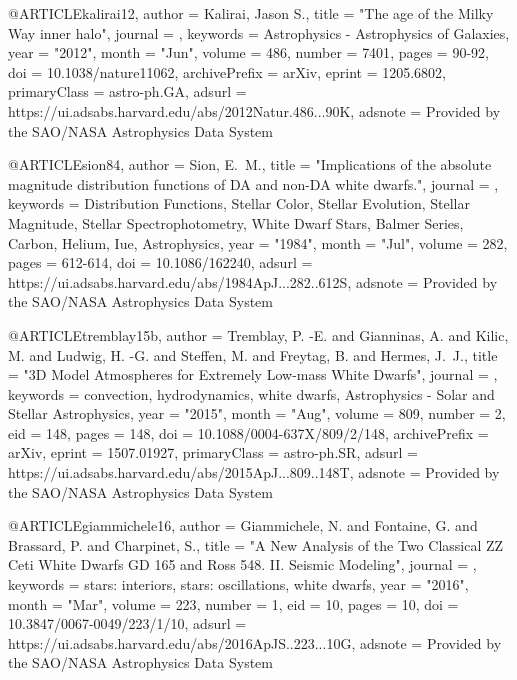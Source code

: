 \documentclass[a4paper,fleqn,usenatbib]{mnras}
\begin{document}
@ARTICLE{kalirai12,
       author = {{Kalirai}, Jason S.},
        title = "{The age of the Milky Way inner halo}",
      journal = {\nat},
     keywords = {Astrophysics - Astrophysics of Galaxies},
         year = "2012",
        month = "Jun",
       volume = {486},
       number = {7401},
        pages = {90-92},
          doi = {10.1038/nature11062},
archivePrefix = {arXiv},
       eprint = {1205.6802},
 primaryClass = {astro-ph.GA},
       adsurl = {https://ui.adsabs.harvard.edu/abs/2012Natur.486...90K},
      adsnote = {Provided by the SAO/NASA Astrophysics Data System}
}

@ARTICLE{sion84,
       author = {{Sion}, E.~M.},
        title = "{Implications of the absolute magnitude distribution functions of DA and non-DA white dwarfs.}",
      journal = {\apj},
     keywords = {Distribution Functions, Stellar Color, Stellar Evolution, Stellar Magnitude, Stellar Spectrophotometry, White Dwarf Stars, Balmer Series, Carbon, Helium, Iue, Astrophysics},
         year = "1984",
        month = "Jul",
       volume = {282},
        pages = {612-614},
          doi = {10.1086/162240},
       adsurl = {https://ui.adsabs.harvard.edu/abs/1984ApJ...282..612S},
      adsnote = {Provided by the SAO/NASA Astrophysics Data System}
}


@ARTICLE{tremblay15b,
       author = {{Tremblay}, P. -E. and {Gianninas}, A. and {Kilic}, M. and
         {Ludwig}, H. -G. and {Steffen}, M. and {Freytag}, B. and
         {Hermes}, J.~J.},
        title = "{3D Model Atmospheres for Extremely Low-mass White Dwarfs}",
      journal = {\apj},
     keywords = {convection, hydrodynamics, white dwarfs, Astrophysics - Solar and Stellar Astrophysics},
         year = "2015",
        month = "Aug",
       volume = {809},
       number = {2},
          eid = {148},
        pages = {148},
          doi = {10.1088/0004-637X/809/2/148},
archivePrefix = {arXiv},
       eprint = {1507.01927},
 primaryClass = {astro-ph.SR},
       adsurl = {https://ui.adsabs.harvard.edu/abs/2015ApJ...809..148T},
      adsnote = {Provided by the SAO/NASA Astrophysics Data System}
}


@ARTICLE{giammichele16,
       author = {{Giammichele}, N. and {Fontaine}, G. and {Brassard}, P. and
         {Charpinet}, S.},
        title = "{A New Analysis of the Two Classical ZZ Ceti White Dwarfs GD 165 and Ross 548. II. Seismic Modeling}",
      journal = {\apjs},
     keywords = {stars: interiors, stars: oscillations, white dwarfs},
         year = "2016",
        month = "Mar",
       volume = {223},
       number = {1},
          eid = {10},
        pages = {10},
          doi = {10.3847/0067-0049/223/1/10},
       adsurl = {https://ui.adsabs.harvard.edu/abs/2016ApJS..223...10G},
      adsnote = {Provided by the SAO/NASA Astrophysics Data System}
}
\end{document}
